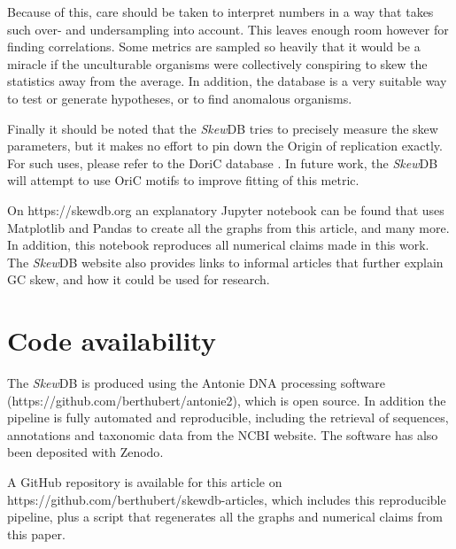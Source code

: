 \documentclass[fleqn,10pt]{wlscirep}
\begin{document}
Because of this, care should be taken to interpret numbers in a way that takes such over- and undersampling into account. This leaves enough room however for finding correlations. Some metrics are sampled so heavily that it would be a miracle if the unculturable organisms were collectively conspiring to skew the statistics away from the average. In addition, the database is a very suitable way to test or generate hypotheses, or to find anomalous organisms.

Finally it should be noted that the \emph{Skew}DB tries to precisely measure the skew parameters, but it makes no effort to pin down the Origin of replication exactly. For such uses, please refer to the DoriC database \cite{luo_doric_2019}. In future work, the \emph{Skew}DB will attempt to use OriC motifs to improve fitting of this metric.

On https://skewdb.org an explanatory Jupyter \cite{Kluyver:2016aa} notebook can be found that uses Matplotlib \cite{Hunter:2007} and Pandas \cite{jeff_reback_2021_5203279} to create all the graphs from this article, and many more. In addition, this notebook reproduces all numerical claims made in this work. The \emph{Skew}DB website also provides links to informal articles that further explain GC skew, and how it could be used for research.

\section*{Code availability}
The \emph{Skew}DB is produced using the Antonie DNA processing software (https://github.com/berthubert/antonie2), which is open source. In addition the pipeline is fully automated and reproducible, including the retrieval of sequences, annotations and taxonomic data from the NCBI website. The software has also been deposited with Zenodo\cite{https://doi.org/10.5281/zenodo.5516524}.

A GitHub repository is available for this article on https://github.com/berthubert/skewdb-articles, which includes this reproducible pipeline, plus a script that regenerates all the graphs and numerical claims from this paper. 
\end{document}
